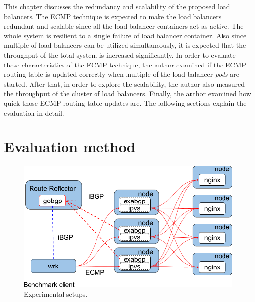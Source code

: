 This chapter discusses the redundancy and scalability of the proposed load balancers.
The ECMP technique is expected to make the load balancers redundant and scalable since all the load balancer containers act as active.
The whole system is resilient to a single failure of load balancer container.
Also since multiple of load balancers can be utilized simultaneously, it is expected that the throughput of the total system is increased significantly.
In order to evaluate these characteristics of the ECMP technique,
the author examined if the ECMP routing table is updated correctly when multiple of the load balancer {\em pods} are started.
After that, in order to explore the scalability, the author also measured the throughput of the cluster of load balancers.
Finally, the author examined how quick those ECMP routing table updates are.
The following sections explain the evaluation in detail.

\section{Evaluation method}

\begin{figure}[b]
  \centering
    \includegraphics[width=0.9\columnwidth]{Figs/lb_ecmp_schem}
    \caption{Experimental setups.}
    \label{fig:lb_ecmp_schem}
\end{figure}


